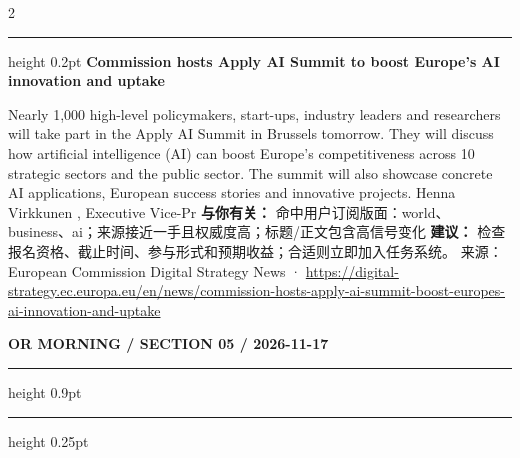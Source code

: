 \documentclass[10.5pt]{ctexart}
\begin{document}
\begin{multicols}{2}
\vspace{2mm}
\hrule height 0.2pt
\vspace{2mm}
{\large\bfseries Commission hosts Apply AI Summit to boost Europe’s AI innovation and uptake}\par
Nearly 1,000 high-level policymakers, start-ups, industry leaders and researchers will take part in the Apply AI Summit in Brussels tomorrow. They will discuss how artificial intelligence (AI) can boost Europe’s competitiveness across 10 strategic sectors and the public sector. The summit will also showcase concrete AI applications, European success stories and innovative projects. Henna Virkkunen , Executive Vice-Pr
\textbf{与你有关：} 命中用户订阅版面：world、business、ai；来源接近一手且权威度高；标题/正文包含高信号变化
\textbf{建议：} 检查报名资格、截止时间、参与形式和预期收益；合适则立即加入任务系统。
{\footnotesize\color{ormuted} 来源：European Commission Digital Strategy News · \url{https://digital-strategy.ec.europa.eu/en/news/commission-hosts-apply-ai-summit-boost-europes-ai-innovation-and-uptake}}
\end{multicols}
\newpage
{\small\bfseries OR MORNING / SECTION 05 / 2026-11-17}
\vspace{2mm}
\hrule height 0.9pt
\vspace{1.5mm}
\hrule height 0.25pt
\vspace{4mm}
\end{document}
